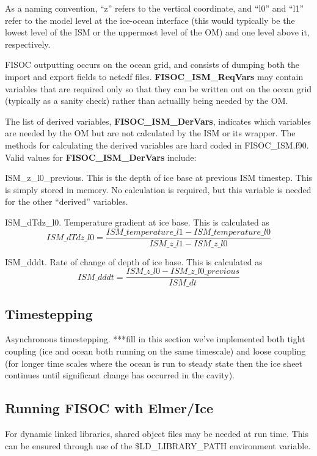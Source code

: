 \documentclass[12pt]{article}
\begin{document}
As a naming convention, ``z'' refers to the vertical coordinate, and ``l0'' and ``l1'' refer to the 
model level at the ice-ocean interface (this would typically be the lowest level of the ISM or 
the uppermost level of the OM) and one level above it, respectively.

FISOC outputting occurs on the ocean grid, and consists of dumping both the import and 
export fields to netcdf files. 
\textbf{FISOC\_ISM\_ReqVars} may contain variables that are required only so that they can be written 
out on the ocean grid (typically as a sanity check) rather than actuallly being needed by the OM.


The list of derived variables, \textbf{FISOC\_ISM\_DerVars}, indicates which variables are needed by the 
OM but are not calculated by the ISM or its wrapper. 
The methods for calculating the derived variables are hard coded in FISOC\_ISM.f90. 
Valid values for  \textbf{FISOC\_ISM\_DerVars} include:

ISM\_z\_l0\_previous.  This is the depth of ice base at previous ISM timestep. This is simply stored 
in memory.  No calculation is required, but this variable is needed for the other ``derived'' variables. 

ISM\_dTdz\_l0.  Temperature gradient at ice base.  This is calculated as 
\begin{equation}
ISM\_dTdz\_l0 = \frac{ISM\_temperature\_l1 - ISM\_temperature\_l0}{ISM\_z\_l1 - ISM\_z\_l0}
\end{equation}

ISM\_dddt.  Rate of change of depth of ice base.  This is calculated as 
\begin{equation}
ISM\_dddt = \frac{ISM\_z\_l0 - ISM\_z\_l0\_previous}{ISM\_dt}
\end{equation}


\subsection{Timestepping}
Asynchronous timestepping.
***fill in this section we've implemented both tight coupling (ice and ocean both running 
on the same timescale) and loose coupling (for longer time scales where the ocean is run 
to steady state then the ice sheet continues until significant change has occurred in the cavity).


\subsection{Running FISOC with Elmer/Ice} 
For dynamic linked libraries, shared object files may be needed at run time.  
This can be ensured through use of 
the \$LD\_LIBRARY\_PATH environment variable. 
\end{document}
